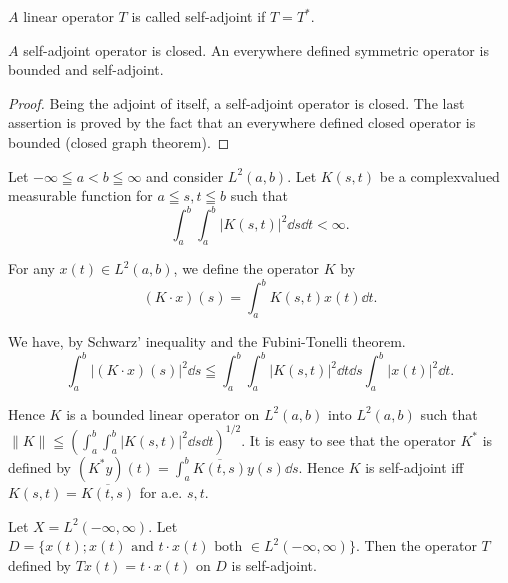 \begin{definition}\label{def:VII.3.Definition.2} $A$ linear operator $T$ is called self-adjoint if $T = T^{*}$. 
\end{definition}

\begin{proposition}\label{prop:VII.3.Proposition.2} $A$ self-adjoint operator is closed. An everywhere defined symmetric operator is bounded and self-adjoint. 
\end{proposition}

\begin{proof}
 Being the adjoint of itself, a self-adjoint operator is closed. The last assertion is proved by the fact that an everywhere defined closed operator is bounded (closed graph theorem). 
\end{proof}

\begin{example}\label{ex:VII.3.Example.1} Let $-\infty \leqq a < b \leqq \infty$ and consider $L^2(a, b)$. Let $K(s, t)$ be a complexvalued measurable function for $a \leqq s, t \leqq b$ such that 
\[
\int_{a} ^{b} \int_{a} ^{b} | K (s, t) | ^{2} \dd s \dd t < \infty .
\]
\end{example}

For any $x(t) \in L^{2}(a, b)$, we define the operator $K$ by 
\[
(K \cdot x) (s) = \int_{a} ^{b} K (s, t) x (t) \dd t.
\]

We have, by Schwarz' inequality and the Fubini-Tonelli theorem. 
\[
\int_{a} ^{b} | (K \cdot x) (s) | ^{2} \dd s \leqq \int_{a} ^{b} \int_{a} ^{b} | K (s, t) | ^{2} \dd t \dd s \int_{a} ^{b} | x (t) | ^{2} \dd t.
\]

Hence $K$ is a bounded linear operator on $L^2(a, b)$ into $L^2(a, b)$ such that $\|K\| \leqq \left( \int_{a}^{b} \int_{a}^{b} |K(s, t)|^2 \dd s \dd t \right)^{1/2}$. It is easy to see that the operator $K^*$ is defined by $(K^* y)(t) = \int_{a}^{b} \overline{K(t, s)} y(s) \dd s$. Hence $K$ is self-adjoint iff $K(s, t) = \overline{K(t, s)}$ for a.e. $s, t$. 

\begin{example}\label{ex:VII.3.Example.2} Let $X = L^2(-\infty, \infty)$. Let $D = \{x(t); x(t) \text{ and } t \cdot x(t) \text{ both } \in L^2(-\infty, \infty)\}$. Then the operator $T$ defined by $Tx(t) = t \cdot x(t)$ on $D$ is self-adjoint. 
\end{example}

